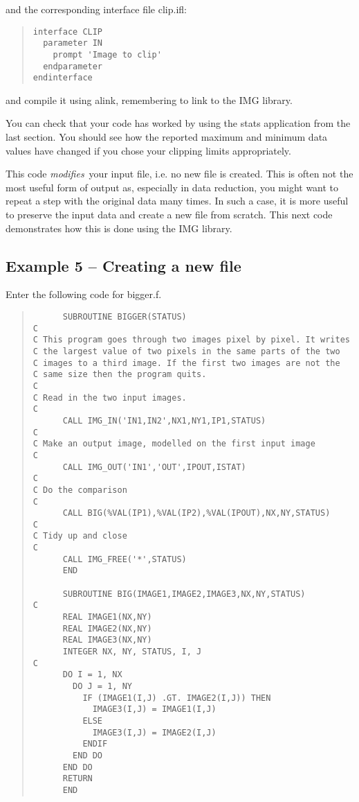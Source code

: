 and the corresponding interface file {\sf clip.ifl}:

\begin{quote}
{\small
\begin{verbatim}
interface CLIP
  parameter IN
    prompt 'Image to clip'
  endparameter
endinterface
\end{verbatim}
}
\end{quote}

and compile it using {\sf alink}, remembering to link to the IMG library.

You can check that your code has worked by using the {\sf stats} application
from the last section. You should see how the reported maximum and 
minimum data values have changed if you chose your clipping limits 
appropriately.

This code {\em modifies}\, your input file, i.e. no new file is created. This
is often not the most useful form of output as, especially in data
reduction, you might want to repeat a step with the original data many
times. In such a case, it is more useful to preserve the input data and 
create a new file from scratch. This next code demonstrates how this is 
done using the {\sf IMG} library.

\subsection{Example 5 -- Creating a new file}

Enter the following code for {\sf bigger.f}.

\begin{quote}
{\small
\begin{verbatim}
      SUBROUTINE BIGGER(STATUS)
C
C This program goes through two images pixel by pixel. It writes
C the largest value of two pixels in the same parts of the two 
C images to a third image. If the first two images are not the
C same size then the program quits.
C
C Read in the two input images.
C
      CALL IMG_IN('IN1,IN2',NX1,NY1,IP1,STATUS)
C
C Make an output image, modelled on the first input image
C
      CALL IMG_OUT('IN1','OUT',IPOUT,ISTAT)
C
C Do the comparison
C
      CALL BIG(%VAL(IP1),%VAL(IP2),%VAL(IPOUT),NX,NY,STATUS)
C
C Tidy up and close
C
      CALL IMG_FREE('*',STATUS)
      END

      SUBROUTINE BIG(IMAGE1,IMAGE2,IMAGE3,NX,NY,STATUS)
C
      REAL IMAGE1(NX,NY)
      REAL IMAGE2(NX,NY)
      REAL IMAGE3(NX,NY)
      INTEGER NX, NY, STATUS, I, J
C
      DO I = 1, NX
        DO J = 1, NY
          IF (IMAGE1(I,J) .GT. IMAGE2(I,J)) THEN
            IMAGE3(I,J) = IMAGE1(I,J)
          ELSE
            IMAGE3(I,J) = IMAGE2(I,J)
          ENDIF
        END DO
      END DO
      RETURN
      END
\end{verbatim}
}
\end{quote}

